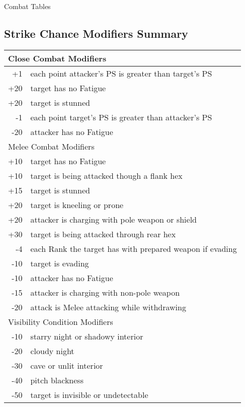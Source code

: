 \begin{Tables}{Combat Tables}

\begin{multicols}{3}

  
\section{Strike Chance Modifiers Summary}

\fontsize{8}{10pt}\selectfont

\begin{tabularx}{\columnwidth}{rX} \hline
\multicolumn{2}{l}{Close Combat Modifiers} \\ \hline
+1 	& each point attacker’s PS is greater than target’s PS \\
+20	& target has no Fatigue \\
+20	& target is stunned \\
-1	& each point target’s PS is greater than attacker’s PS \\
-20	& attacker has no Fatigue \\ \hline
\multicolumn{2}{l}{Melee Combat Modifiers} \\ \hline
+10	& target has no Fatigue \\
+10	& target is being attacked though a flank hex \\
+15	& target is stunned \\
+20	& target is kneeling or prone \\
+20	& attacker is charging with pole weapon or shield \\
+30	& target is being attacked through rear hex \\
-4	& each Rank the target has with prepared weapon if evading \\
-10	& target is evading \\
-10	& attacker has no Fatigue \\
-15	& attacker is charging with non-pole weapon \\
-20	& attack is Melee attacking while withdrawing \\ \hline
\multicolumn{2}{l}{Visibility Condition Modifiers} \\ \hline
-10	& starry night or shadowy interior \\
-20	& cloudy night \\
-30	& cave or unlit interior \\
-40	& pitch blackness \\
-50	& target is invisible or undetectable \\ \hline

\end{tabularx}
\end{multicols}
\end{Tables}
